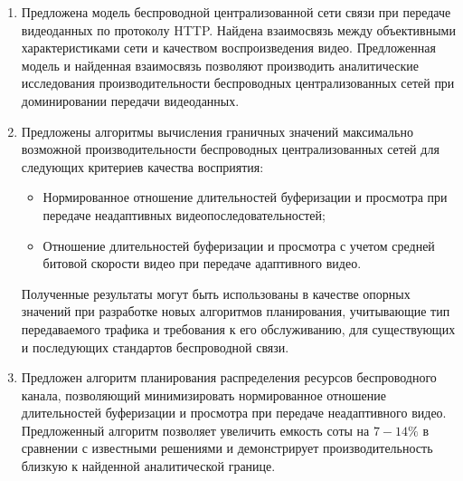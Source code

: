 \begin{enumerate}
    \item Предложена модель беспроводной централизованной сети связи при передаче видеоданных по протоколу HTTP. Найдена взаимосвязь между объективными характеристиками сети и качеством воспроизведения видео. Предложенная модель и найденная взаимосвязь позволяют производить аналитические исследования производительности беспроводных централизованных сетей при доминировании передачи видеоданных.
    \item Предложены алгоритмы вычисления граничных значений максимально возможной производительности беспроводных централизованных сетей для следующих критериев качества восприятия:
    \begin{itemize}
	    \item Нормированное отношение длительностей буферизации и просмотра при передаче неадаптивных видеопоследовательностей;
	    \item Отношение длительностей буферизации и просмотра с учетом средней битовой скорости видео при передаче адаптивного видео.
    \end{itemize}
    Полученные результаты могут быть использованы в качестве опорных значений при разработке новых алгоритмов планирования, учитывающие тип передаваемого трафика и требования к его обслуживанию, для существующих и последующих стандартов беспроводной связи.
    \item Предложен алгоритм планирования распределения ресурсов беспроводного канала, позволяющий минимизировать нормированное отношение длительностей буферизации и просмотра при передаче неадаптивного видео. Предложенный алгоритм позволяет увеличить емкость соты на $7-14\%$ в сравнении с известными решениями и демонстрирует производительность близкую к найденной аналитической границе.
\end{enumerate}
